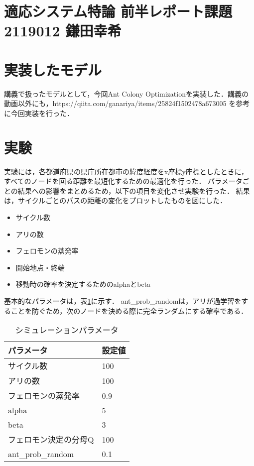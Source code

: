 \documentclass[11pt,a4paper]{jsarticle}
\begin{document}
%
%
\section*{適応システム特論 前半レポート課題 2119012 鎌田幸希}

\section{実装したモデル}

講義で扱ったモデルとして，今回Ant Colony Optimizationを実装した．講義の動画以外にも，https://qiita.com/ganariya/items/25824f1502478a673005 を参考に今回実装を行った．

\section{実験}

実験には，各都道府県の県庁所在都市の緯度経度をx座標y座標としたときに，すべてのノードを回る距離を最短化するための最適化を行った．
パラメータごとの結果への影響をまとめるため，以下の項目を変化させ実験を行った．
結果は，サイクルごとのパスの距離の変化をプロットしたものを図にした．

\begin{itemize}
  \item サイクル数
  \item アリの数
  \item フェロモンの蒸発率
  \item 開始地点・終端
  \item 移動時の確率を決定するためのalphaとbeta
\end{itemize}

基本的なパラメータは，表\ref{param}に示す．
ant\_prob\_randomは，アリが過学習をすることを防ぐため，次のノードを決める際に完全ランダムにする確率である．

\begin{table}[hb]
  \caption{シミュレーションパラメータ}
  \centering
  \label{param}
  \begin{tabular}{l|l}
    \hline
    パラメータ            & 設定値 \\ \hline
    サイクル数             & 100 \\
    アリの数            & 100 \\
    フェロモンの蒸発率             & 0.9 \\
    alpha  & 5 \\
    beta              & 3 \\
    フェロモン決定の分母Q & 100 \\
    ant\_prob\_random & 0.1 \\
    \hline
  \end{tabular}
\end{table}
\end{document}
